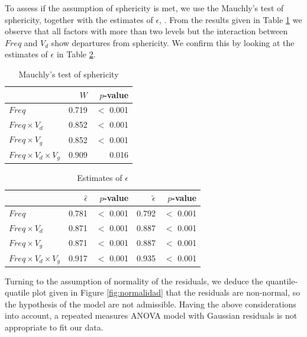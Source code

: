 \documentclass[sn-mathphys]{sn-jnl}%
\theoremstyle{thmstyleone}%
\theoremstyle{thmstyletwo}%
\theoremstyle{thmstylethree}%
\begin{document}
To assess if the assumption of sphericity is met, we use the Mauchly's test of sphericity, together with the estimates of $\epsilon$, \cite{BHN2000}. From the results given in Table \ref{fig:mauchyls} we observe that all factors with more than two levels but the interaction between $Freq$ and $V_d$ show departures from sphericity. We confirm this by looking at the estimates of $\epsilon$ in Table \ref{tab:epsilontable}. 

\begin{table}[!t]
	\centering
	\caption{Mauchly's test of sphericity} 
	\begin{tabular}{lrr}
		\hline
		& $W$ &  $p$-value \\ 
		\hline
		$Freq$ & 0.719 & $<$ 0.001 \\ 
		$Freq \times V_d$ & 0.852   & $<$ 0.001 \\ 
		$Freq \times V_g$ & 0.852   & $<$ 0.001 \\ 
		$Freq \times V_d \times V_g$ & 0.909  & 0.016 \\ 
		\hline
	\end{tabular}
	\label{fig:mauchyls}
\end{table}


\begin{table}[!t]
	\centering
	\begin{tabular}{lrrrr}
		\hline
		& $\hat{\epsilon}$ & $p$-value &$\tilde{\epsilon}$&$p$-value \\ 
		\hline
		$ Freq$ & 0.781&$<$ 0.001  & 0.792 &$<$ 0.001 \\ 
		$Freq \times V_d$ & 0.871&$<$ 0.001  & 0.887&$<$ 0.001  \\ 
		$Freq \times V_g$ & 0.871&$<$ 0.001  & 0.887&$<$ 0.001  \\ 
		$Freq \times V_d \times V_g$ & 0.917&$<$ 0.001  & 0.935&$<$ 0.001  \\ 
		\hline
	\end{tabular}
	\caption{Estimates of $\epsilon$} 
	\label{tab:epsilontable}
\end{table}

Turning to the assumption of normality of the residuals, we deduce the quantile-quatile plot given in Figure \ref{fig:normalidad} that the residuals are non-normal, so the hypothesis of the model are not admissible. Having the above considerations into account, a repeated measures ANOVA model with Gaussian residuals is not appropriate to fit our data. 
\end{document}
